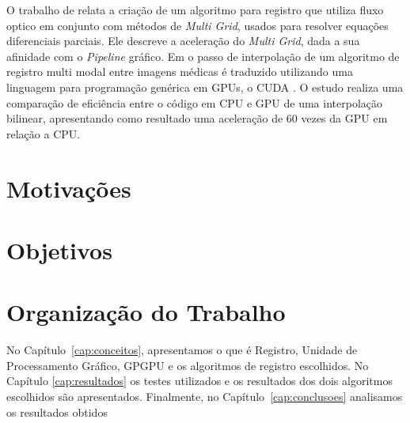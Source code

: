 	O trabalho de \cite{grossauer2008gpu} relata a criação de um algoritmo para registro que utiliza fluxo optico em 
conjunto com métodos de \textit{Multi Grid}, usados para resolver equações diferenciais parciais. Ele descreve
a aceleração do \textit{Multi Grid}, dada a sua afinidade com o \textit{Pipeline} gráfico. Em \cite{bui2009performance}
o passo de interpolação de um algoritmo de registro multi modal entre imagens médicas é traduzido utilizando uma 
linguagem para programação genérica em GPUs, o CUDA \cite{nvidia2007compute}. O estudo realiza uma comparação de 
eficiência entre o código em CPU e GPU de uma interpolação bilinear, apresentando como resultado uma aceleração de 60 
vezes da GPU em relação a CPU.
	
\section{Motivações}

\section{Objetivos}

\section{Organização do Trabalho}
\label{sec:organizacao_trabalho}

No Capítulo~\ref{cap:conceitos}, apresentamos o que é Registro, Unidade de Processamento Gráfico, GPGPU e os algoritmos 
de registro escolhidos. No Capítulo \ref{cap:resultados} os testes utilizados e os resultados dos dois algoritmos 
escolhidos são apresentados. Finalmente, no Capítulo~\ref{cap:conclusoes} analisamos os resultados obtidos 